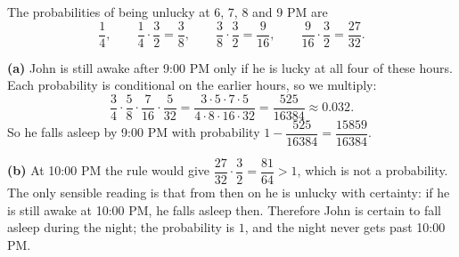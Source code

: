 The probabilities of being unlucky at 6, 7, 8 and 9 PM are
\[
\dfrac{1}{4},\qquad \dfrac{1}{4}\cdot\dfrac{3}{2}=\dfrac{3}{8},\qquad \dfrac{3}{8}\cdot\dfrac{3}{2}=\dfrac{9}{16},\qquad \dfrac{9}{16}\cdot\dfrac{3}{2}=\dfrac{27}{32}.
\]

\textbf{(a)} John is still awake after 9:00 PM only if he is lucky at all four of these hours. Each probability is conditional on the earlier hours, so we multiply:
\[
\dfrac{3}{4}\cdot\dfrac{5}{8}\cdot\dfrac{7}{16}\cdot\dfrac{5}{32}=\dfrac{3\cdot5\cdot7\cdot5}{4\cdot8\cdot16\cdot32}=\boxed{\dfrac{525}{16384}}\approx0.032 .
\]
So he falls asleep by 9:00 PM with probability $1-\dfrac{525}{16384}=\dfrac{15859}{16384}$.

\textbf{(b)} At 10:00 PM the rule would give $\dfrac{27}{32}\cdot\dfrac{3}{2}=\dfrac{81}{64}>1$, which is not a probability. The only sensible reading is that from then on he is unlucky with certainty: if he is still awake at 10:00 PM, he falls asleep then. Therefore John is certain to fall asleep during the night; the probability is $\boxed{1}$, and the night never gets past 10:00 PM.
